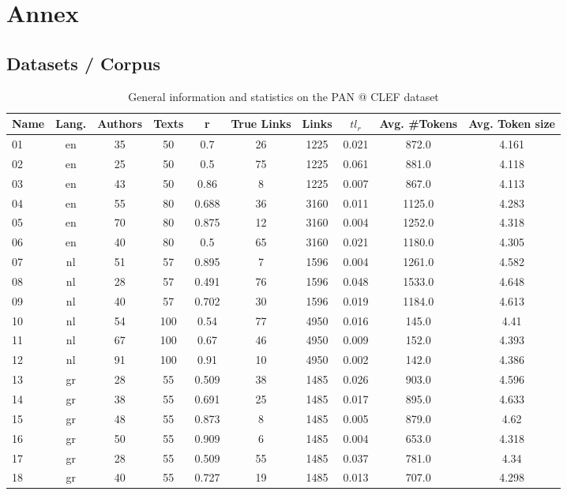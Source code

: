 \section{Annex \label{sec:annex}}

\subsection{Datasets / Corpus}
\label{sec:annex_dataset_corpus}

\begin{table*}[H]
  \caption{General information and statistics on the PAN @ CLEF dataset}
  \label{tab:pan_datasets}

  \begin{tabular}{l c c c c c c c c c}
    \toprule
    \textbf{Name} &
    \textbf{Lang.} &
    \textbf{Authors} &
    \textbf{Texts} &
    \textbf{r} &
    \textbf{True Links} &
    \textbf{Links} &
    \textbf{$tl_r$} &
    \textbf{Avg. \#Tokens} &
    \textbf{Avg. Token size} \\
    \midrule
      01 & en & 35 & 50 & 0.7 & 26 & 1225 & 0.021 & 872.0 & 4.161 \\
      02 & en & 25 & 50 & 0.5 & 75 & 1225 & 0.061 & 881.0 & 4.118 \\
      03 & en & 43 & 50 & 0.86 & 8 & 1225 & 0.007 & 867.0 & 4.113 \\
      04 & en & 55 & 80 & 0.688 & 36 & 3160 & 0.011 & 1125.0 & 4.283 \\
      05 & en & 70 & 80 & 0.875 & 12 & 3160 & 0.004 & 1252.0 & 4.318 \\
      06 & en & 40 & 80 & 0.5 & 65 & 3160 & 0.021 & 1180.0 & 4.305 \\
      07 & nl & 51 & 57 & 0.895 & 7 & 1596 & 0.004 & 1261.0 & 4.582 \\
      08 & nl & 28 & 57 & 0.491 & 76 & 1596 & 0.048 & 1533.0 & 4.648 \\
      09 & nl & 40 & 57 & 0.702 & 30 & 1596 & 0.019 & 1184.0 & 4.613 \\
      10 & nl & 54 & 100 & 0.54 & 77 & 4950 & 0.016 & 145.0 & 4.41 \\
      11 & nl & 67 & 100 & 0.67 & 46 & 4950 & 0.009 & 152.0 & 4.393 \\
      12 & nl & 91 & 100 & 0.91 & 10 & 4950 & 0.002 & 142.0 & 4.386 \\
      13 & gr & 28 & 55 & 0.509 & 38 & 1485 & 0.026 & 903.0 & 4.596 \\
      14 & gr & 38 & 55 & 0.691 & 25 & 1485 & 0.017 & 895.0 & 4.633 \\
      15 & gr & 48 & 55 & 0.873 & 8 & 1485 & 0.005 & 879.0 & 4.62 \\
      16 & gr & 50 & 55 & 0.909 & 6 & 1485 & 0.004 & 653.0 & 4.318 \\
      17 & gr & 28 & 55 & 0.509 & 55 & 1485 & 0.037 & 781.0 & 4.34 \\
      18 & gr & 40 & 55 & 0.727 & 19 & 1485 & 0.013 & 707.0 & 4.298 \\
    \bottomrule
  \end{tabular}


\end{table*}
